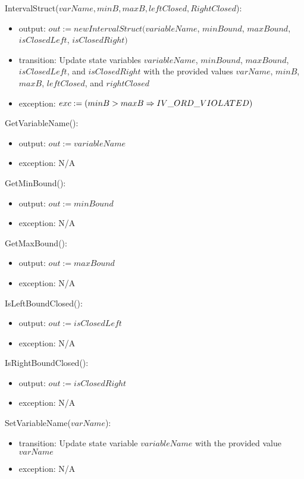 \documentclass[12pt, titlepage]{article}
\begin{document}
\noindent IntervalStruct($varName, minB, maxB, leftClosed, RightClosed$):
\begin{itemize}
	\item output: $out := new IntervalStruct(variableName$, $minBound$, 
	$maxBound$, $isClosedLeft$, $isClosedRight)$
	\item transition: Update state variables $variableName$, $minBound$, 
	$maxBound$, $isClosedLeft$, and $isClosedRight$ with the provided values 
	$varName$, $minB$, $maxB$, $leftClosed$, and $rightClosed$
	\item exception: $exc := \\
	(minB > maxB \Rightarrow IV\_ORD\_VIOLATED)$
\end{itemize}

\noindent GetVariableName():
\begin{itemize}
	\item output: $out := variableName$
	\item exception: N/A
\end{itemize}

\noindent GetMinBound():
\begin{itemize}
	\item output: $out := minBound$
	\item exception: N/A
\end{itemize}

\noindent GetMaxBound():
\begin{itemize}
	\item output: $out := maxBound$
	\item exception: N/A
\end{itemize}

\noindent IsLeftBoundClosed():
\begin{itemize}
	\item output: $out := isClosedLeft$
	\item exception: N/A
\end{itemize}

\noindent IsRightBoundClosed():
\begin{itemize}
	\item output: $out := isClosedRight$
	\item exception: N/A
\end{itemize}

\noindent SetVariableName($varName$):
\begin{itemize}
	\item transition: Update state variable $variableName$ with the provided 
	value $varName$
	\item exception: N/A
\end{itemize}
\end{document}
